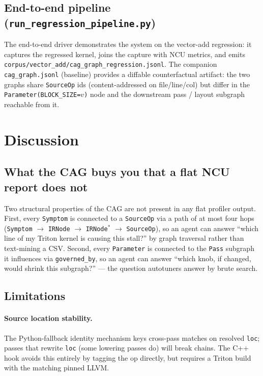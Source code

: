 \documentclass[10pt]{article}
\begin{document}
\subsection{End-to-end pipeline (\texttt{run\_regression\_pipeline.py})}

The end-to-end driver demonstrates the system on the vector-add regression: it captures the regressed kernel, joins the capture with NCU metrics, and emits \texttt{corpus/vector\_add/cag\_graph\_regression.jsonl}. The companion \texttt{cag\_graph.jsonl} (baseline) provides a diffable counterfactual artifact: the two graphs share \texttt{SourceOp} ids (content-addressed on file/line/col) but differ in the \texttt{Parameter(BLOCK\_SIZE=$v$)} node and the downstream pass / layout subgraph reachable from it.

\section{Discussion}

\subsection{What the CAG buys you that a flat NCU report does not}

Two structural properties of the CAG are not present in any flat profiler output. First, every \texttt{Symptom} is connected to a \texttt{SourceOp} via a path of at most four hops (\texttt{Symptom} $\to$ \texttt{IRNode} $\to$ \texttt{IRNode}$^*$ $\to$ \texttt{SourceOp}), so an agent can answer ``which line of my Triton kernel is causing this stall?'' by graph traversal rather than text-mining a CSV. Second, every \texttt{Parameter} is connected to the \texttt{Pass} subgraph it influences via \texttt{governed\_by}, so an agent can answer ``which knob, if changed, would shrink this subgraph?'' --- the question autotuners answer by brute search.

\subsection{Limitations}

\paragraph{Source location stability.} The Python-fallback identity mechanism keys cross-pass matches on resolved \texttt{loc}; passes that rewrite \texttt{loc} (some lowering passes do) will break chains. The C++ hook avoids this entirely by tagging the op directly, but requires a Triton build with the matching pinned LLVM.
\end{document}
